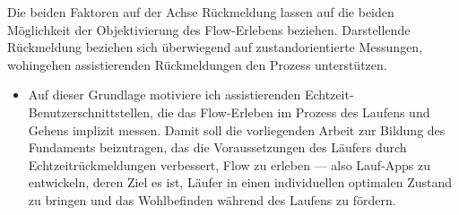 Die beiden Faktoren auf der Achse Rückmeldung lassen auf die beiden Möglichkeit der Objektivierung des Flow-Erlebens beziehen. Darstellende Rückmeldung beziehen sich überwiegend auf zustandorientierte Messungen, wohingehen assistierenden Rückmeldungen den Prozess unterstützen. 
\begin{itemize}
	
	\item Auf dieser Grundlage motiviere ich assistierenden Echtzeit-Benutzerschnittstellen, die das Flow-Erleben im Prozess des Laufens und Gehens implizit messen. Damit soll die vorliegenden Arbeit zur Bildung des Fundaments beizutragen, das die Voraussetzungen des Läufers durch Echtzeitrückmeldungen verbessert, Flow zu erleben --- also Lauf-Apps zu entwickeln, deren Ziel es ist, Läufer in einen individuellen optimalen Zustand zu bringen und das Wohlbefinden während des Laufens zu fördern.
\end{itemize}

